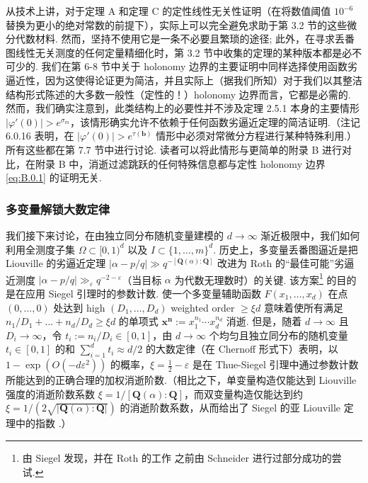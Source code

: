 从技术上讲，对于定理 A 和定理 C 的定性线性无关性证明（在将数值阈值 $10^{-6}$ 替换为更小的绝对常数的前提下），实际上可以完全避免求助于第 3.2 节的这些微分代数材料. 然而，坚持不使用它是一条不必要且繁琐的途径; 此外，在寻求丢番图线性无关测度的任何定量精细化时，第 3.2 节中收集的定理的某种版本都是必不可少的. 我们在第 6-8 节中关于 holonomy 边界的主要证明中同样选择使用函数劣逼近性，因为这使得论证更为简洁，并且实际上（据我们所知）对于我们以其整洁结构形式陈述的大多数一般性（定性的！）holonomy 边界而言，它都是必需的. 然而，我们确实注意到，此类结构上的必要性并不涉及定理 2.5.1 本身的主要情形 $|\varphi'(0)| > e^{\sigma_m}$，该情形确实允许不依赖于任何函数劣逼近定理的简洁证明.（注记 6.0.16 表明，在 $|\varphi'(0)| > e^{\tau(\mathbf{b})}$ 情形中必须对常微分方程进行某种特殊利用.）所有这些都在第 7.7 节中进行讨论. 读者可以将此情形与更简单的附录 B 进行对比，在附录 B 中，消逝过滤跳跃的任何特殊信息都与定性 holonomy 边界 \eqref{eq:B.0.1} 的证明无关.

\subsubsection{多变量解锁大数定律}\label{sec:2.13.4}
我们接下来讨论，在由独立同分布随机变量建模的 $d \to \infty$ 渐近极限中，我们如何利用全测度子集 $\Omega \subset [0,1)^d$ 以及 $I \subset \{1,\ldots,m\}^d$. 历史上，多变量丢番图逼近是把 Liouville 的劣逼近定理 $|\alpha - p/q| \gg q^{-[\mathbf{Q}(\alpha):\mathbf{Q}]}$ 改进为 Roth 的“最佳可能”劣逼近测度 $|\alpha - p/q| \gg_{\varepsilon} q^{-2-\varepsilon}$（当目标 $\alpha$ 为代数无理数时）的关键. 该方案\footnote{由 Siegel 发现，并在 Roth 的工作 \cite{Rot55} 之前由 Schneider \cite{Sch36} 进行过部分成功的尝试.} 的目的是在应用 Siegel 引理时的参数计数. 使一个多变量辅助函数 $F(x_1, \ldots, x_d)$ 在点 $(0,\ldots,0)$ 处达到 high $(D_1, \ldots, D_d)$ weighted order $\geq \xi d$ 意味着使所有满足 $n_1/D_1+\ldots+n_d/D_d\geq \xi d$ 的单项式 $\mathbf{x}^{\mathbf{n}} := x_1^{n_1}\cdots x_d^{n_d}$ 消逝. 但是，随着 $d\to\infty$ 且 $D_i\to\infty$，令 $t_i := n_i/D_i \in [0,1]$，由 $d \to \infty$ 个均匀且独立同分布的随机变量 $t_i \in [0,1]$ 的和 $\sum_{i=1}^{d} t_i \approx d/2$ 的大数定律（在 Chernoff 形式下）表明，以 $1 - \exp(O(-d\varepsilon^2))$ 的概率，$\xi = \frac{1}{2} - \varepsilon$ 是在 Thue-Siegel 引理中通过参数计数所能达到的正确合理的加权消逝阶数.（相比之下，单变量构造仅能达到 Liouville 强度的消逝阶数系数 $\xi = 1/[\mathbf{Q}(\alpha) : \mathbf{Q}]$，而双变量构造仅能达到约 $\xi = 1/(2\sqrt{|\mathbf{Q}(\alpha):\mathbf{Q}|})$ 的消逝阶数系数，从而给出了 Siegel 的亚 Liouville 定理中的指数 \cite{Sie1921}.）


